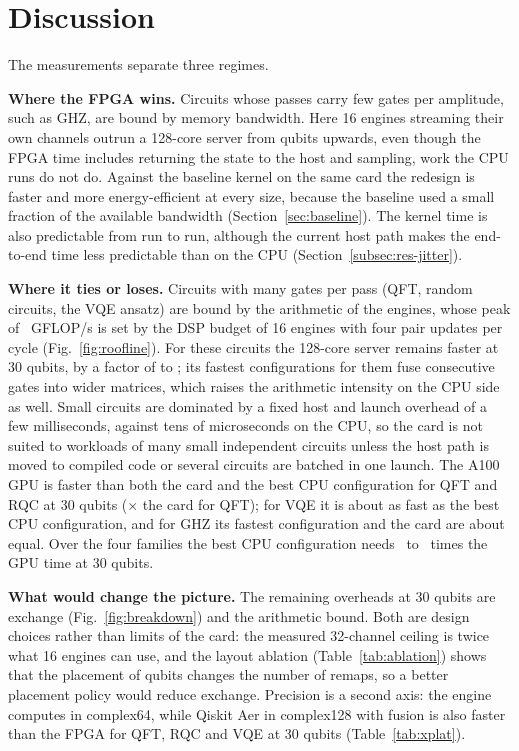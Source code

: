 \section{Discussion}\label{sec:discussion}

The measurements separate three regimes.

\textbf{Where the FPGA wins.} Circuits whose passes carry few gates per amplitude, such as GHZ, are bound by memory bandwidth. Here 16 engines streaming their own channels outrun a 128-core server from \NumXplatGhzCrossN{} qubits upwards, even though the FPGA time includes returning the state to the host and sampling, work the CPU runs do not do. Against the baseline kernel on the same card the redesign is faster and more energy-efficient at every size, because the baseline used a small fraction of the available bandwidth (Section~\ref{sec:baseline}). The kernel time is also predictable from run to run, although the current host path makes the end-to-end time less predictable than on the CPU (Section~\ref{subsec:res-jitter}).

\textbf{Where it ties or loses.} Circuits with many gates per pass (QFT, random circuits, the VQE ansatz) are bound by the arithmetic of the engines, whose peak of \NumFlagComputeRoof~GFLOP/s is set by the DSP budget of 16 engines with four pair updates per cycle (Fig.~\ref{fig:roofline}). For these circuits the 128-core server remains faster at 30 qubits, by a factor of \NumXplatCpuFasterOtherThirtyMin to \NumXplatCpuFasterOtherThirtyMax; its fastest configurations for them fuse consecutive gates into wider matrices, which raises the arithmetic intensity on the CPU side as well. Small circuits are dominated by a fixed host and launch overhead of a few milliseconds, against tens of microseconds on the CPU, so the card is not suited to workloads of many small independent circuits unless the host path is moved to compiled code or several circuits are batched in one launch. The A100 GPU is faster than both the card and the best CPU configuration for QFT and RQC at 30 qubits (\NumXplatBestGpuRatioQftThirty$\times$ the card for QFT); for VQE it is about as fast as the best CPU configuration, and for GHZ its fastest configuration and the card are about equal. Over the four families the best CPU configuration needs \NumXplatGpuOverCpuThirtyMin~to \NumXplatGpuOverCpuThirtyMax~times the GPU time at 30 qubits.

\textbf{What would change the picture.} The remaining overheads at 30 qubits are exchange (Fig.~\ref{fig:breakdown}) and the arithmetic bound. Both are design choices rather than limits of the card: the measured 32-channel ceiling is twice what 16 engines can use, and the layout ablation (Table~\ref{tab:ablation}) shows that the placement of qubits changes the number of remaps, so a better placement policy would reduce exchange. Precision is a second axis: the engine computes in complex64, while Qiskit Aer in complex128 with fusion is also faster than the FPGA for QFT, RQC and VQE at 30 qubits (Table~\ref{tab:xplat}).


